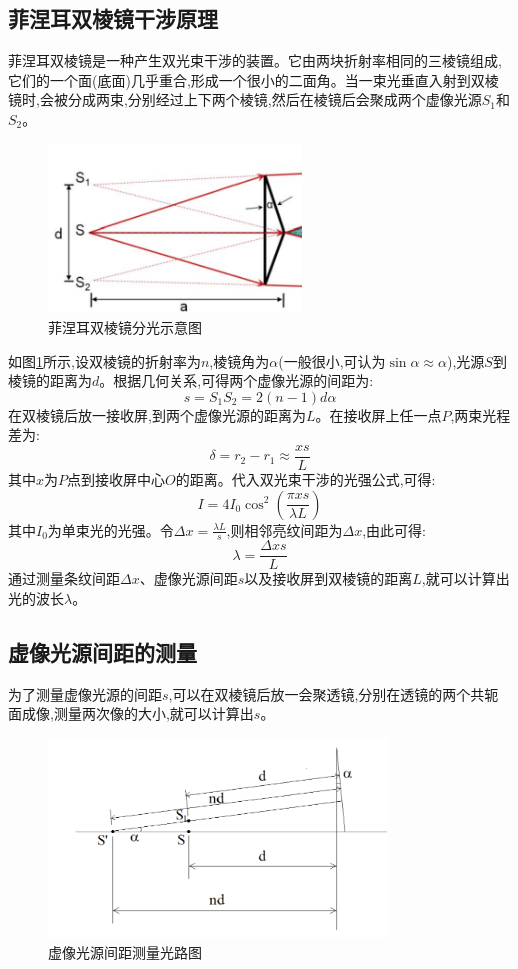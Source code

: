 \documentclass[UTF8]{ctexart}
\begin{document}
\subsection{菲涅耳双棱镜干涉原理}
菲涅耳双棱镜是一种产生双光束干涉的装置。它由两块折射率相同的三棱镜组成,它们的一个面(底面)几乎重合,形成一个很小的二面角。当一束光垂直入射到双棱镜时,会被分成两束,分别经过上下两个棱镜,然后在棱镜后会聚成两个虚像光源$S_1$和$S_2$。

\begin{figure}[htbp]
    \centering
    \includegraphics[width=0.6\textwidth]{prism}
    \caption{菲涅耳双棱镜分光示意图}
    \label{fig:fresnel_biprism}
\end{figure}

如图\ref{fig:fresnel_biprism}所示,设双棱镜的折射率为$n$,棱镜角为$\alpha$(一般很小,可认为$\sin\alpha\approx\alpha$),光源$S$到棱镜的距离为$d$。根据几何关系,可得两个虚像光源的间距为:
$$s=S_1S_2=2(n-1)d\alpha$$
在双棱镜后放一接收屏,到两个虚像光源的距离为$L$。在接收屏上任一点$P$,两束光程差为:
$$\delta=r_2-r_1\approx\frac{xs}{L}$$
其中$x$为$P$点到接收屏中心$O$的距离。代入双光束干涉的光强公式,可得:
$$I=4I_0\cos^2(\frac{\pi xs}{\lambda L})$$
其中$I_0$为单束光的光强。令$\Delta x=\frac{\lambda L}{s}$,则相邻亮纹间距为$\Delta x$,由此可得:
$$\lambda=\frac{\Delta xs}{L}$$
通过测量条纹间距$\Delta x$、虚像光源间距$s$以及接收屏到双棱镜的距离$L$,就可以计算出光的波长$\lambda$。

\subsection{虚像光源间距的测量}
为了测量虚像光源的间距$s$,可以在双棱镜后放一会聚透镜,分别在透镜的两个共轭面成像,测量两次像的大小,就可以计算出$s$。

\begin{figure}[!htbp]
    \centering
    \includegraphics[width=0.8\textwidth]{sourced.png}
    \caption{虚像光源间距测量光路图}
    \label{fig:virtual_source_distance}
\end{figure}
\end{document}
